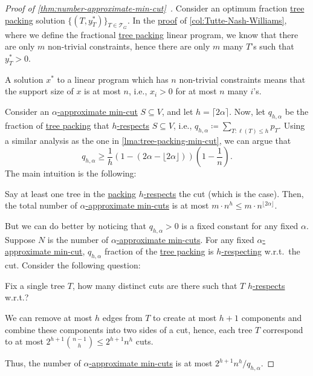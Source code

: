 \begin{proof}[Proof of \autoref{thm:number-approximate-min-cut}~\cite{chekuri2020lp}]
	Consider an optimum fraction \hyperref[prb:tree-packing]{tree packing} solution \(\{ (T, y_T^{\ast} ) \}_{T \in \mathcal{T} _G} \). In the \hyperref[pf:col:Tutte-Nash-Williams]{proof} of \autoref{col:Tutte-Nash-Williams}, where we define the fractional \hyperref[prb:tree-packing]{tree packing} linear program, we know that there are only \(m\) non-trivial constraints, hence there are only \(m\) many \(T\)'s such that \(y^{\ast} _T > 0\).

	\begin{prev}
		A solution \(x^{\ast} \) to a linear program which has \(n\) non-trivial constraints means that the support size of \(x\) is at most \(n\), i.e., \(x_i > 0\) for at most \(n\) many \(i\)'s.
	\end{prev}

	Consider an \hyperref[def:approximate-min-cut]{\(\alpha \)-approximate min-cut} \(S \subseteq V\), and let \(h = \lceil 2 \alpha \rceil \). Now, let \(q_{h, \alpha }\) be the fraction of \hyperref[prb:tree-packing]{tree packing} that \hyperref[def:respect]{\(h\)-respects} \(S \subseteq V\), i.e., \(q_{h, \alpha } \coloneqq \sum_{T \colon \ell (T) \leq h} p_T\). Using a similar analysis as the one in \autoref{lma:tree-packing-min-cut}, we can argue that
	\[
		q_{h, \alpha }
		\geq \frac{1}{h} (1 - (2\alpha - \lfloor 2 \alpha \rfloor )) \left( 1 - \frac{1}{n} \right) .
	\]
	The main intuition is the following:

	\begin{intuition}
		Say at least one tree in the \hyperref[prb:tree-packing]{packing} \hyperref[def:respect]{\(h\)-respects} the cut (which is the case). Then, the total number of \hyperref[def:approximate-min-cut]{\(\alpha \)-approximate min-cuts} is at most \(m \cdot n^h \leq m \cdot n ^{\lfloor 2 \alpha \rfloor }\).
	\end{intuition}

	But we can do better by noticing that \(q_{h, \alpha } > 0\) is a fixed constant for any fixed \(\alpha \). Suppose \(N\) is the number of \hyperref[def:approximate-min-cut]{\(\alpha \)-approximate min-cuts}. For any fixed \hyperref[def:approximate-min-cut]{\(\alpha \)-approximate min-cut}, \(q_{h, \alpha }\) fraction of the \hyperref[prb:tree-packing]{tree packing} is \hyperref[def:respect]{\(h\)-respecting} w.r.t.\ the cut. Consider the following question:

	\begin{problem*}
		Fix a single tree \(T\), how many distinct cuts are there such that \(T\) \hyperref[def:respect]{\(h\)-respects} w.r.t.?
	\end{problem*}
	\begin{answer}
		We can remove at most \(h\) edges from \(T\) to create at most \(h + 1\) components and combine these components into two sides of a cut, hence, each tree \(T\) correspond to at most \(2^{h+1} \binom{n-1}{h} \leq 2^{h+1} n^h\) cuts.
	\end{answer}

	Thus, the number of \hyperref[def:approximate-min-cut]{\(\alpha \)-approximate min-cuts} is at most \(2^{h+1} n^h / q_{h, \alpha }\).
\end{proof}